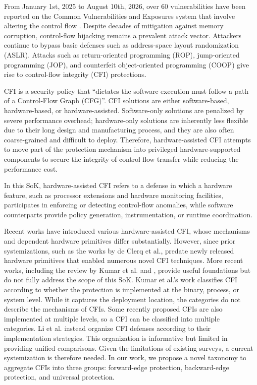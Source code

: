 \documentclass[journal,onecolumn]{IEEEtran}
\begin{document}
From January 1st, 2025 to August 10th, 2026, over 60 vulnerabilities have been reported on the Common Vulnerabilities and Exposures system that involve altering the control flow \cite{cve-website}. Despite decades of mitigation against memory corruption, control-flow hijacking remains a prevalent attack vector. Attackers continue to bypass basic defenses such as address-space layout randomization (ASLR). Attacks such as return-oriented programming (ROP), jump-oriented programming (JOP), and counterfeit object-oriented programming (COOP) give rise to control-flow integrity (CFI) protections.

CFI is a security policy that ``dictates the software execution must follow a path of a Control-Flow Graph (CFG)''\cite{Abadi05}. CFI solutions are either software-based, hardware-based, or hardware-assisted\cite{Kumar22}. Software-only solutions are penalized by severe performance overhead\cite{Kumar22}; hardware-only solutions are inherently less flexible due to their long design and manufacturing process, and they are also often coarse-grained and difficult to deploy. Therefore, hardware-assisted CFI attempts to move part of the protection mechanism into privileged hardware-supported components to secure the integrity of control-flow transfer while reducing the performance cost.

In this SoK, hardware-assisted CFI refers to a defense in which a hardware feature, such as processor extensions and hardware monitoring facilities, participates in enforcing or detecting control-flow anomalies, while software counterparts provide policy generation, instrumentation, or runtime coordination.

Recent works have introduced various hardware-assisted CFI, whose mechanisms and dependent hardware primitives differ substantially. However, since prior systemizations, such as the works by de Clerq et al.\cite{Clercq17}, predate newly released hardware primitives that enabled numerous novel CFI techniques. More recent works, including the review by Kumar et al.\cite{Kumar22} and \cite{Li23}, provide useful foundations but do not fully address the scope of this SoK. Kumar et al.'s work\cite{Kumar22} classifies CFI according to whether the protection is implemented at the binary, process, or system level. While it captures the deployment location, the categories do not describe the mechanisms of CFIs. Some recently proposed CFIs are also implemented at multiple levels, so a CFI can be classified into multiple categories. Li et al.\cite{Li23} instead organize CFI defenses according to their implementation strategies. This organization is informative but limited in providing unified comparisons. Given the limitations of existing surveys, a current systemization is therefore needed. In our work, we propose a novel taxonomy to aggregate CFIs into three groups: forward-edge protection, backward-edge protection, and universal protection.
\end{document}
